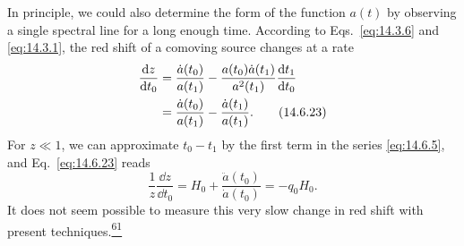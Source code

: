 In principle, we could also determine the form of the function \(a(t)\) by
observing a single spectral line for a long enough time. According to
Eqs.~\eqref{eq:14.3.6} and \eqref{eq:14.3.1}, the red shift of a comoving
source changes at a rate
\begin{align}
  \frac{\mathop{}\!\mathrm{d} z}{\mathop{}\!\mathrm{d} t_0}
  &=
  \frac{\dot a(t_0)}{a(t_1)}
  -
  \frac{a(t_0)\dot a(t_1)}{a^2(t_1)}
  \frac{\mathop{}\!\mathrm{d} t_1}{\mathop{}\!\mathrm{d} t_0}
  \notag\\
  &=
  \frac{\dot a(t_0)}{a(t_1)}
  -
  \frac{\dot a(t_1)}{a(t_1)}.
  \tag{14.6.23}\label{eq:14.6.23}
\end{align}
For \(z\ll1\), we can approximate \(t_0-t_1\) by the first term in the
series \eqref{eq:14.6.5}, and Eq.~\eqref{eq:14.6.23} reads
\begin{equation}
  \frac{1}{z}\frac{\dd z}{\dd t_0}
  =
  H_0+\frac{\ddot a(t_0)}{\dot a(t_0)}
  =
  -q_0H_0.
  \tag{14.6.24}\label{eq:14.6.24}
\end{equation}
It does not seem possible to measure this very slow change in red shift with
present techniques.\hyperref[ch14-ref-61]{\textsuperscript{61}}

